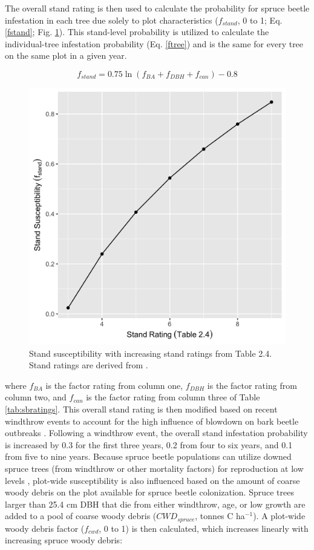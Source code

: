\documentclass[a4paper, 12pt] {report}
\begin{document}
The overall stand rating is then used to calculate the probability for spruce beetle infestation in each tree due solely to plot characteristics ($f_{stand}$, 0 to 1; Eq. \ref{fstand}; Fig. \ref{fig:ffstand}). This stand-level probability is utilized to calculate the individual-tree infestation probability (Eq. \ref{ftree}) and is the same for every tree on the same plot in a given year.

\begin{equation} \label{fstand}
f_{stand} = 0.75\ln(f_{BA} + f_{DBH} + f_{can}) - 0.8
\end{equation}

\begin{figure}
  \includegraphics[width=0.65\linewidth]{Figures/fstand.png}
  \caption{Stand susceptibility with increasing stand ratings from Table 2.4. Stand ratings are derived from \protect{}.}
  \label{fig:ffstand}
\end{figure}

where $f_{BA}$ is the factor rating from column one, $f_{DBH}$ is the factor rating from column two, and $f_{can}$ is the factor rating from column three of Table \ref{tab:sbratings}. This overall stand rating is then modified based on recent windthrow events to account for the high influence of blowdown on bark beetle outbreaks . Following a windthrow event, the overall stand infestation probability is increased by 0.3 for the first three years, 0.2 from four to six years, and 0.1 from five to nine years. Because spruce beetle populations can utilize downed spruce trees (from windthrow or other mortality factors) for reproduction at low levels \cite{schmidSpruceBeetleRockies1977}, plot-wide susceptibility is also influenced based on the amount of coarse woody debris on the plot available for spruce beetle colonization. Spruce trees larger than 25.4 cm DBH that die from either windthrow, age, or low growth are added to a pool of coarse woody debris ($CWD_{spruce}$, tonnes C ha$^{-1}$). A plot-wide woody debris factor ($f_{cwd}$, 0 to 1) is then calculated, which increases linearly with increasing spruce woody debris:
\end{document}
